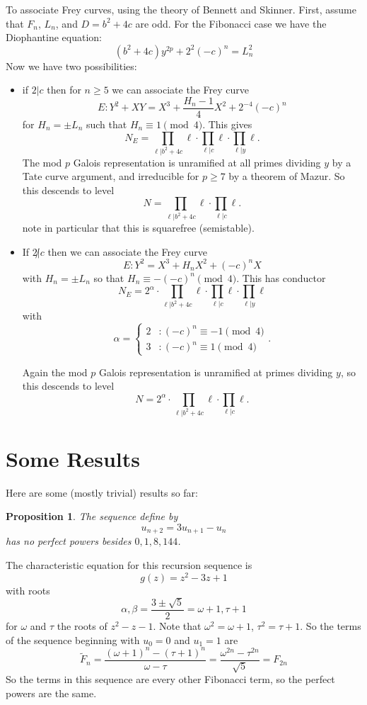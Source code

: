 \documentclass[12pt]{article}
\newtheorem{prop}[thm]{Proposition}
\newenvironment{proof}[1][Proof.]{\begin{trivlist}
\item[\hskip \labelsep {\bfseries #1}]}{\end{trivlist}}
\begin{document}
To associate Frey curves, using the theory of Bennett and Skinner.  First, assume that $F_n$, $L_n$, and $D = b^2+4c$ are odd.  For the Fibonacci case we have the Diophantine equation:
\[(b^2+4c)y^{2p} +2^2(-c)^n = L_n^2 \]
Now we have two possibilities:

\begin{itemize}

\item if $2 |c$ then for $n \geq 5$ we can associate the Frey curve
\[ E: Y^2 +XY = X^3 +\frac{H_n -1}{4} X^2 +2^{-4}(-c)^n \]
for $H_n = \pm L_n$ such that $H_n \equiv 1 \pmod{4}$.  This gives
\[ N_E = \prod_{\ell | b^2+4c} \ell \cdot \prod_{\ell | c} \ell \cdot \prod_{\ell | y} \ell. \]
The mod $p$ Galois representation is unramified at all primes dividing $y$ by a Tate curve argument, and irreducible for $p \geq 7$ by a theorem of Mazur.  So this descends to level 
\[N = \prod_{\ell | b^2+4c} \ell \cdot \prod_{\ell | c} \ell . \]
note in particular that this is squarefree (semistable).

\item If $2 \not | c$ then we can associate the Frey curve
\[ E: Y^2 = X^3 + H_n X^2 +(-c)^n X\]
with $H_n = \pm L_n$ so that $H_n \equiv -(-c)^n \pmod{4}$.  This has conductor
\[N_E = 2^{\alpha} \cdot  \prod_{\ell | b^2+4c} \ell \cdot \prod_{\ell | c} \ell \cdot \prod_{\ell | y} \ell\] 
with
\[ \alpha = \begin{cases} 2 & : (-c)^n \equiv -1 \pmod{4} \\ 3 & : (-c)^n \equiv 1 \pmod{4} \end{cases}. \]

Again the mod $p$ Galois representation is unramified at primes dividing $y$, so this descends to level
\[ N = 2^\alpha \cdot \prod_{\ell | b^2+4c} \ell \cdot \prod_{\ell | c} \ell . \]

\end{itemize}




\section{Some Results}

Here are some (mostly trivial) results so far:

\begin{prop}
The sequence define by
\[ u_{n+2} = 3u_{n+1}-u_n \]
has no perfect powers besides $0,1,8,144$.
\end{prop}

\begin{proof}
The characteristic equation for this recursion sequence is
\[g(z) = z^2-3z+1\]
with roots
\[ \alpha, \beta = \frac{3 \pm \sqrt{5}}{2} = \omega+1, \tau+1 \]
for $\omega$ and $\tau$ the roots of $z^2-z-1$.  Note that $\omega^2 = \omega+1$, $\tau^2 = \tau + 1$.  So the terms of the sequence beginning with $u_0 = 0$ and $u_1 = 1$ are
\[ \tilde{F}_n = \frac{(\omega+1)^n - (\tau+1)^n}{\omega-\tau} = \frac{\omega^{2n} - \tau^{2n}}{\sqrt{5}} = F_{2n} \]
So the terms in this sequence are every other Fibonacci term, so the perfect powers are the same.
\end{proof}
\end{document}
